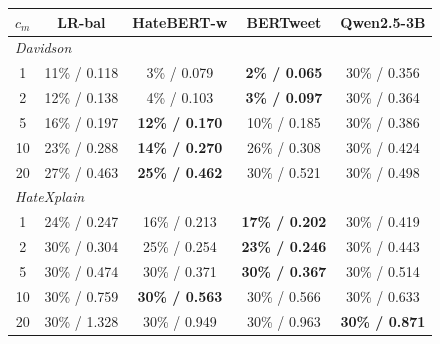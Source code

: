 \begin{tabular}{ccccc}
\toprule
$c_m$ & LR-bal & HateBERT-w & BERTweet & Qwen2.5-3B \\
\midrule
\multicolumn{5}{l}{\textit{Davidson}} \\
1 & 11\% / 0.118 & 3\% / 0.079 & \textbf{2\% / 0.065} & 30\% / 0.356 \\
2 & 12\% / 0.138 & 4\% / 0.103 & \textbf{3\% / 0.097} & 30\% / 0.364 \\
5 & 16\% / 0.197 & \textbf{12\% / 0.170} & 10\% / 0.185 & 30\% / 0.386 \\
10 & 23\% / 0.288 & \textbf{14\% / 0.270} & 26\% / 0.308 & 30\% / 0.424 \\
20 & 27\% / 0.463 & \textbf{25\% / 0.462} & 30\% / 0.521 & 30\% / 0.498 \\
\midrule
\multicolumn{5}{l}{\textit{HateXplain}} \\
1 & 24\% / 0.247 & 16\% / 0.213 & \textbf{17\% / 0.202} & 30\% / 0.419 \\
2 & 30\% / 0.304 & 25\% / 0.254 & \textbf{23\% / 0.246} & 30\% / 0.443 \\
5 & 30\% / 0.474 & 30\% / 0.371 & \textbf{30\% / 0.367} & 30\% / 0.514 \\
10 & 30\% / 0.759 & \textbf{30\% / 0.563} & 30\% / 0.566 & 30\% / 0.633 \\
20 & 30\% / 1.328 & 30\% / 0.949 & 30\% / 0.963 & \textbf{30\% / 0.871} \\
\bottomrule
\end{tabular}
